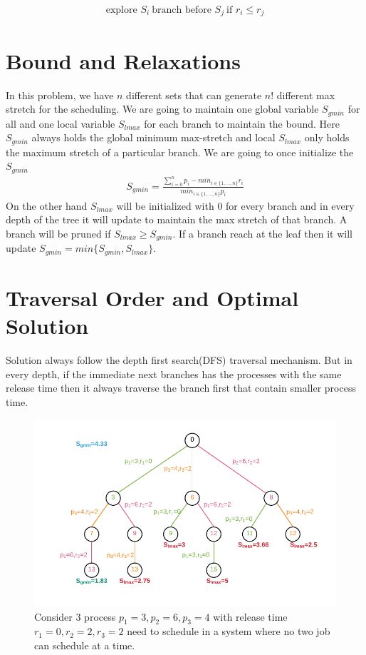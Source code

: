 \documentclass[11pt, conference, onecolumn]{IEEEtran}
\begin{document}
\begin{equation*}
\begin{array}{l}
\text{explore }S_i \ \text{branch before } S_j\ \text{if }  r_{i}\leq r_{j} 
\end{array}
\end{equation*}

\section{Bound and Relaxations}
In this problem, we have $n$ different sets that can generate $n!$ different max stretch for the scheduling. We are going to maintain 
one global variable $S_{gmin}$ for all and one local variable $S_{lmax}$ for each branch to maintain the bound. 
Here $S_{gmin}$  always holds the global minimum max-stretch and local $S_{lmax}$ only holds the maximum stretch 
of a particular branch.
We are going to once initialize the $S_{gmin}$
\begin{equation*}
\begin{array}{l}
S_{gmin} = \frac{\sum_{i=0}^{n}p_i - min_{i\in\{1,\dots,n\}}r_i}{min_{i\in\{1,\dots,n\}}p_i}
\end{array}
\end{equation*}
On the other hand $S_{lmax}$ will be initialized with $0$ for every branch and in every depth of the tree it will update to maintain the 
max stretch of that branch. A branch will be pruned if $S_{lmax}\geq S_{gmin}$.  If a branch reach at the leaf then it will update 
$S_{gmin} = min\{S_{gmin}, S_{lmax}\}$. 

\section{Traversal Order and Optimal Solution}
Solution always follow the depth first search(DFS) traversal mechanism. But in every depth, if the immediate next branches has the processes 
with the same release time then it always traverse the branch first that contain smaller process time. 
\begin{figure}
\centering
\includegraphics[width=0.96\linewidth]{schedule.pdf}
\caption{Consider 3 process $p_1=3,p_2=6,p_3=4$ with release time $r_1=0,r_2=2,r_3=2$ need to schedule in a system where no two job can schedule at  a time.}
\end{figure}
\end{document}
